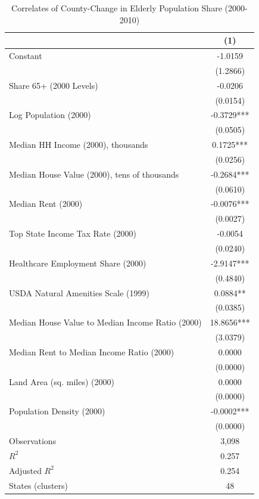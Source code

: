 \begin{table}[htbp]
\centering
\caption{Correlates of County-Change in Elderly Population Share (2000-2010)}
\label{tab:elderly_regression}
\begin{tabular}{lc}
\hline
& (1) \\
\hline
Constant & -1.0159 \\
 & (1.2866) \\
[0.5em]
Share 65+ (2000 Levels) & -0.0206 \\
 & (0.0154) \\
[0.5em]
Log Population (2000) & -0.3729*** \\
 & (0.0505) \\
[0.5em]
Median HH Income (2000), thousands & 0.1725*** \\
 & (0.0256) \\
[0.5em]
Median House Value (2000), tens of thousands & -0.2684*** \\
 & (0.0610) \\
[0.5em]
Median Rent (2000) & -0.0076*** \\
 & (0.0027) \\
[0.5em]
Top State Income Tax Rate (2000) & -0.0054 \\
 & (0.0240) \\
[0.5em]
Healthcare Employment Share (2000) & -2.9147*** \\
 & (0.4840) \\
[0.5em]
USDA Natural Amenities Scale (1999) & 0.0884** \\
 & (0.0385) \\
[0.5em]
Median House Value to  Median Income Ratio (2000) & 18.8656*** \\
 & (3.0379) \\
[0.5em]
Median Rent to  Median Income Ratio (2000) & 0.0000 \\
 & (0.0000) \\
[0.5em]
Land Area (sq. miles) (2000) & 0.0000 \\
 & (0.0000) \\
[0.5em]
Population Density (2000) & -0.0002*** \\
 & (0.0000) \\
\hline
Observations & 3,098 \\
$R^2$ & 0.257 \\
Adjusted $R^2$ & 0.254 \\
States (clusters) & 48 \\
\hline
\end{tabular}
\end{table}